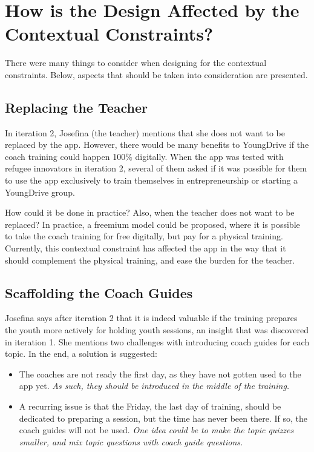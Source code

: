 \section{How is the Design Affected by the Contextual Constraints?}

There were many things to consider when designing for the contextual constraints. Below, aspects that should be taken into consideration are presented.

\subsection{Replacing the Teacher}
In iteration 2, Josefina (the teacher) mentions that she does not want to be replaced by the app. However, there would be many benefits to YoungDrive if the coach training could happen 100\% digitally. When the app was tested with refugee innovators in iteration 2, several of them asked if it was possible for them to use the app exclusively to train themselves in entrepreneurship or starting a YoungDrive group.

How could it be done in practice? Also, when the teacher does not want to be replaced? In practice, a freemium model could be proposed, where it is possible to take the coach training for free digitally, but pay for a physical training. Currently, this contextual constraint has affected the app in the way that it should complement the physical training, and ease the burden for the teacher.

\subsection{Scaffolding the Coach Guides}
Josefina says after iteration 2 that it is indeed valuable if the training prepares the youth more actively for holding youth sessions, an insight that was discovered in iteration 1. She mentions two challenges with introducing coach guides for each topic. In the end, a solution is suggested:

\begin{itemize}
\item The coaches are not ready the first day, as they have not gotten used to the app yet. \textit{As such, they should be introduced in the middle of the training.}
\item A recurring issue is that the Friday, the last day of training, should be dedicated to preparing a session, but the time has never been there. If so, the coach guides will not be used. \textit{One idea could be to make the topic quizzes smaller, and mix topic questions with coach guide questions.}
\end{itemize}

